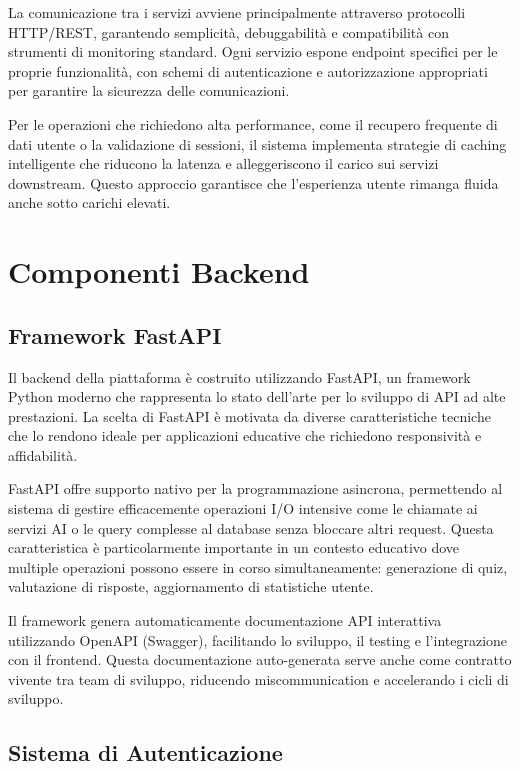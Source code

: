 \documentclass[12pt,a4paper]{article}
\begin{document}
La comunicazione tra i servizi avviene principalmente attraverso protocolli HTTP/REST, garantendo semplicità, debuggabilità e compatibilità con strumenti di monitoring standard. Ogni servizio espone endpoint specifici per le proprie funzionalità, con schemi di autenticazione e autorizzazione appropriati per garantire la sicurezza delle comunicazioni.

Per le operazioni che richiedono alta performance, come il recupero frequente di dati utente o la validazione di sessioni, il sistema implementa strategie di caching intelligente che riducono la latenza e alleggeriscono il carico sui servizi downstream. Questo approccio garantisce che l'esperienza utente rimanga fluida anche sotto carichi elevati.

\section{Componenti Backend}

\subsection{Framework FastAPI}

Il backend della piattaforma è costruito utilizzando FastAPI, un framework Python moderno che rappresenta lo stato dell'arte per lo sviluppo di API ad alte prestazioni. La scelta di FastAPI è motivata da diverse caratteristiche tecniche che lo rendono ideale per applicazioni educative che richiedono responsività e affidabilità.

FastAPI offre supporto nativo per la programmazione asincrona, permettendo al sistema di gestire efficacemente operazioni I/O intensive come le chiamate ai servizi AI o le query complesse al database senza bloccare altri request. Questa caratteristica è particolarmente importante in un contesto educativo dove multiple operazioni possono essere in corso simultaneamente: generazione di quiz, valutazione di risposte, aggiornamento di statistiche utente.

Il framework genera automaticamente documentazione API interattiva utilizzando OpenAPI (Swagger), facilitando lo sviluppo, il testing e l'integrazione con il frontend. Questa documentazione auto-generata serve anche come contratto vivente tra team di sviluppo, riducendo miscommunication e accelerando i cicli di sviluppo.

\subsection{Sistema di Autenticazione}
\end{document}
